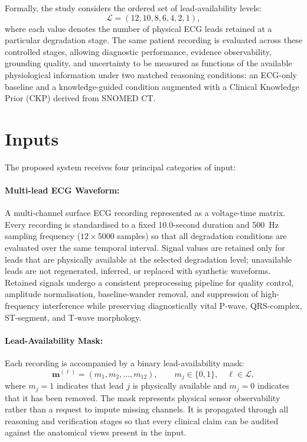\documentclass{ssnreview}
\begin{document}
Formally, the study considers the ordered set of lead-availability levels:
\begin{equation}
  \mathcal{L} = (12, 10, 8, 6, 4, 2, 1),
\end{equation}
where each value denotes the number of physical ECG leads retained at a particular
degradation stage. The same patient recording is evaluated across these controlled stages,
allowing diagnostic performance, evidence observability, grounding quality, and uncertainty
to be measured as functions of the available physiological information under two matched
reasoning conditions: an ECG-only baseline and a knowledge-guided condition augmented with a
Clinical Knowledge Prior (CKP) derived from SNOMED CT.

\section{Inputs}

The proposed system receives four principal categories of input:

\paragraph{Multi-lead ECG Waveform:} A multi-channel surface ECG recording represented as a
voltage-time matrix. Every recording is standardised to a fixed 10.0-second duration and
500~Hz sampling frequency ($12 \times 5000$ samples) so that all degradation conditions are
evaluated over the same temporal interval. Signal values are retained only for leads that are
physically available at the selected degradation level; unavailable leads are not
regenerated, inferred, or replaced with synthetic waveforms. Retained signals undergo a
consistent preprocessing pipeline for quality control, amplitude normalisation,
baseline-wander removal, and suppression of high-frequency interference while preserving
diagnostically vital P-wave, QRS-complex, ST-segment, and T-wave morphology.

\paragraph{Lead-Availability Mask:} Each recording is accompanied by a binary lead-availability
mask:
\begin{equation}
  \mathbf{m}^{(\ell)} = (m_1,m_2,\ldots,m_{12}), \qquad
  m_j \in \{0,1\}, \quad \ell \in \mathcal{L},
\end{equation}
where $m_j=1$ indicates that lead $j$ is physically available and $m_j=0$ indicates that it
has been removed. The mask represents physical sensor observability rather than a request to
impute missing channels. It is propagated through all reasoning and verification stages so that
every clinical claim can be audited against the anatomical views present in the input.
\end{document}

